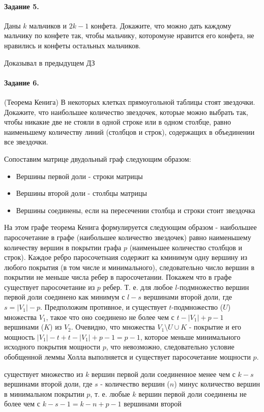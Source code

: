 \documentclass[a4paper,12pt]{article}
\begin{document}
\paragraph{Задание 5.} Даны $k$ мальчиков и $2k-1$ конфета. Докажите, что можно дать каждому мальчику по конфете так, чтобы мальчику, которомуне нравится его конфета, не нравились и конфеты остальных мальчиков.

\begin{Solution}
Доказывал в предыдущем ДЗ
\end{Solution}

\paragraph{Задание 6.} (Теорема Кенига) В некоторых клетках прямоугольной таблицы стоят звездочки. Докажите, что наибольшее количество звездочек, которые можно выбрать так, чтобы никакие две не стояли в одной строке или в одном столбце, равно наименьшему количеству линий (столбцов и строк), содержащих в объединении все звездочки.

\begin{Solution}
Сопоставим матрице двудольный граф следующим образом:
\begin{itemize}
\item Вершины первой доли - строки матрицы

\item Вершины второй доли - столбцы матрицы

\item Вершины соединены, если на пересечении столбца и строки стоит звездочка
\end{itemize}
На этом графе теорема Кенига формулируется следующим образом - наибольшее паросочетание в графе (наибольшее количество звездочек) равно наименьшему количеству вершин в покрытии графа $p$ (наименьшее количество столбцов и строк). Каждое ребро паросочетнаия содержит ка кминимум одну вершину из любого покрытия (в том числе и минимального), следовательно число вершин в покрытии не меньше числа ребер в паросочетании. Покажем что в графе существует паросочетание из $p$ ребер. Т. е. для любое $l$-подмножество вершин первой доли соединено как минимум с $l-s$ вершинами второй доли, где $s = \left|V_1\right|-p$. Предположим противное, и существует $t$-подмножество ($U$) множества $V_1$, такое что оно соединено не более чем с $t-\left|V_1\right|+p-1$ вершинами ($K$) из $V_2$. Очевидно, что множества $V_1 \setminus U \cup K$ - покрытие и его мощность $\left|V_1\right| - t + t - \left|V_1\right| + p -1 = p-1$, которое меньше минимального исходного покрытия мощности $p$, что невозможно, следовательно условие обобщенной леммы Холла выполняется и существует паросочетание мощности $p$. 

существует множество из $k$ вершин первой доли соединенное менее чем с $k-s$ вершинами второй доли, где $s$ - количество вершин ($n$) минус количество вершин в минимальном покрытии $p$, т. е. любые $k$ вершин первой доли соединены не более чем с $k-s-1 = k - n + p -1$ вершинами второй
\end{Solution}
\end{document}
